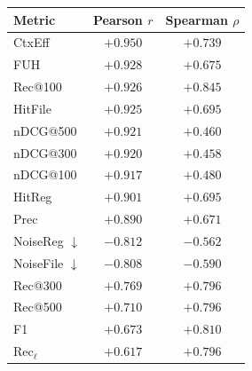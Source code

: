 \documentclass{llmxive}
\providecommand{\arraystretch}{1.18}
\begin{document}
\begin{table}[t]
\begin{minipage}[t]{0.46\linewidth}
  \end{minipage}\hfill
  \begin{minipage}[t]{0.51\linewidth}
    \vspace{0pt}
    \centering
    \label{tab:correlation}
    \vspace{1mm}
    \footnotesize
\renewcommand{\arraystretch}{1.12}
\setlength{\tabcolsep}{6pt}
\begin{tabular}{@{} l cc @{}}
  \toprule
  Metric & Pearson $r$ & Spearman $\rho$ \\
  \midrule
  CtxEff                 & $+0.950$ & $+0.739$ \\
  FUH                    & $+0.928$ & $+0.675$ \\
  Rec@100                & $+0.926$ & $+0.845$ \\
  HitFile                & $+0.925$ & $+0.695$ \\
  nDCG@500               & $+0.921$ & $+0.460$ \\
  nDCG@300               & $+0.920$ & $+0.458$ \\
  nDCG@100               & $+0.917$ & $+0.480$ \\
  HitReg                 & $+0.901$ & $+0.695$ \\
  Prec                   & $+0.890$ & $+0.671$ \\
  NoiseReg $\downarrow$  & $-0.812$ & $-0.562$ \\
  NoiseFile $\downarrow$ & $-0.808$ & $-0.590$ \\
  Rec@300                & $+0.769$ & $+0.796$ \\
  Rec@500                & $+0.710$ & $+0.796$ \\
  F1                     & $+0.673$ & $+0.810$ \\
  Rec$_\ell$             & $+0.617$ & $+0.796$ \\
  \bottomrule
\end{tabular}

  \end{minipage}
  \vspace{-2mm}
\end{table}
\end{document}
